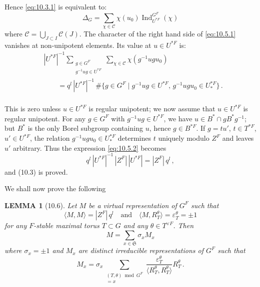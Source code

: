 \documentclass{amsart}
\theoremstyle{plain}
\newtheorem{lemma}[theorem]{LEMMA}
\theoremstyle{remark}
\DeclareMathOperator{\Ind}{Ind}
\begin{document}
Hence \eqref{eq:10.3.1} is equivalent to:
\begin{equation}\label{eq:10.5.1}
\Delta_G = \sum_{\chi \in \mathcal{C}} \chi(u_0) \Ind_{U^{*F}}^{G^F}(\chi)
\end{equation}
where $\mathcal{C} = \bigcup_{J \subset I} \mathcal{C}(J)$. The character of the right hand side of \eqref{eq:10.5.1} vanishes at non-unipotent elements. Its value at $u \in U^{*F}$ is:
\begin{equation}\label{eq:10.5.2}
\begin{aligned}
&|U^{*F}|^{-1} \sum_{\substack{g \in G^F \\ g^{-1}ug \in U^{*F}}} \sum_{\chi \in \mathcal{C}} \chi(g^{-1}ugu_0) \\
&\qquad = q^l\, |U^{*F}|^{-1}\, \#\{g \in G^F \mid g^{-1}ug \in U^{*F},\, g^{-1}ugu_0 \in U_*^{*F}\}\,.\\
\end{aligned}
\end{equation}

This is zero unless $u \in U^{*F}$ is regular unipotent; we now assume that $u \in U^{*F}$ is regular unipotent. For any $g \in G^F$ with $g^{-1}ug \in U^{*F}$, we have $u \in B^* \cap gB^*g^{-1}$; but $B^*$ is the only Borel subgroup containing $u$, hence $g \in B^{*F}$. If $g = tu'$, $t \in T^{*F}$, $u' \in U^{*F}$, the relation $g^{-1}ugu_0 \in U_*^{*F}$ determines $t$ uniquely modulo $Z^F$ and leaves $u'$ arbitrary. Thus the expression \eqref{eq:10.5.2} becomes
\[
q^l\, |U^{*F}|^{-1}\, |Z^F|\, |U^{*F}| = |Z^F|\, q^l\,,
\]
and (10.3) is proved.

We shall now prove the following

\begin{lemma}[10.6]
Let $M$ be a virtual representation of $G^F$ such that
\[
\langle M, M \rangle = |Z^F|\, q^l \quad \text{and} \quad \langle M, R_T^\theta \rangle = \varepsilon_T^\theta = \pm 1
\]
for any $F$-stable maximal torus $T \subset G$ and any $\theta \in T^{\vee F}$. Then
\[
M = \sum_{x \in \mathfrak{S}} \sigma_x M_x
\]
where $\sigma_x = \pm 1$ and $M_x$ are distinct irreducible representations of $G^F$ such that
\[
M_x = \sigma_x \sum_{\substack{(T, \theta) \bmod G^F \\ [\theta] = x}} \frac{\varepsilon_T^\theta}{\langle R_T^\theta, R_T^\theta \rangle} R_T^\theta\,.
\]
\end{lemma}
\end{document}
